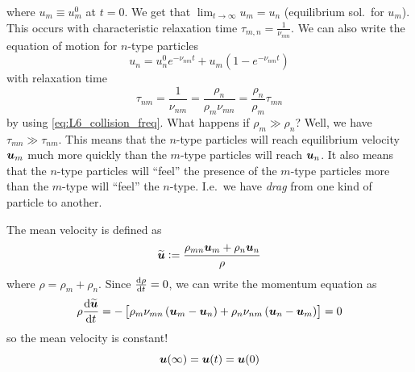 where \(u_m\equiv u_m^0\) at \(t=0\). We get that \(\lim_{t\rightarrow\infty}u_m=u_n\) (equilibrium sol.\ for \(u_m\)). This occurs with characteristic relaxation time \(\tau_{m,n}=\frac{1}{\nu_{mn}}\). We can also write the equation of motion for \(n\)-type particles
\begin{equation*}
    u_n=u_n^0e^{-\nu_{nm}t}+u_m\left(1-e^{-\nu_{nm}t}\right)
\end{equation*}
with relaxation time
\begin{equation*}
    \tau_{nm}=\frac{1}{\nu_{nm}}=\frac{\rho_n}{\rho_m\nu_{mn}}=\frac{\rho_n}{\rho_m}\tau_{mn}
\end{equation*}
by using \cref{eq:L6_collision_freq}. What happens if \(\rho_m\gg\rho_n\)? Well, we have \(\tau_{mn}\gg\tau_{nm}\). This means that the \(n\)-type particles will reach equilibrium velocity \(\boldsymbol{u}_m\) much more quickly than the \(m\)-type particles will reach \(\boldsymbol{u}_n\). It also means that the \(n\)-type particles will ``feel'' the presence of the \(m\)-type particles more than the \(m\)-type will ``feel'' the \(n\)-type. I.e.\ we have \emph{drag} from one kind of particle to another.

The mean velocity is defined as
\begin{equation*}
    \widetilde{\boldsymbol{u}}:=\frac{\rho_{mn}\boldsymbol{u}_m+\rho_n\boldsymbol{u}_n}{\rho}
\end{equation*}
where \(\rho=\rho_m+\rho_n\). Since \(\frac{\textnormal{d}\rho}{\textnormal{d}t}=0\), we can write the momentum equation as
\begin{equation*}
    \rho\frac{\textnormal{d}\widetilde{\boldsymbol{u}}}{\textnormal{d}t}=-\left[\rho_m\nu_{mn}\left(\boldsymbol{u}_m-\boldsymbol{u}_n\right)+\rho_n\nu_{nm}\left(\boldsymbol{u}_n-\boldsymbol{u}_m\right)\right]=0
\end{equation*}
so the mean velocity is constant!
\begin{equation*}
    \boldsymbol{u}(\infty)=\boldsymbol{u}(t)=\boldsymbol{u}(0)
\end{equation*}

